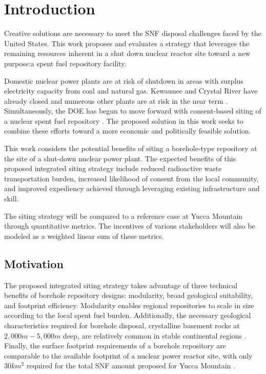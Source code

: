
\section{Introduction}
Creative solutions are necessary to meet the \gls{SNF} disposal challenges 
faced by the United States.
This work proposes and evaluates a strategy that leverages the 
remaining resources inherent in a shut down nuclear reactor site toward a new 
purpose:a spent fuel repository facility.

Domestic nuclear power plants are at risk of shutdown in areas with surplus 
electricity capacity from coal and natural gas. Kewaunee and Crystal River 
have already closed  and numerous other plants are at risk in the near term 
\cite{nei_nuclear_2016}.  Simultaneously, the \gls{DOE} 
has begun to move forward with consent-based siting of a nuclear 
spent fuel repository \cite{doe_designing_2016}. The proposed solution in this 
work seeks to combine these efforts toward a more economic and politically 
feasible solution. 

This work considers the potential benefits of siting a borehole-type repository 
at the site of a shut-down nuclear power plant.  The  expected benefits of this 
proposed integrated siting strategy include reduced radioactive waste 
transportation burden, increased likelihood of consent from the local 
community, and improved expediency achieved through leveraging existing 
infrastructure and skill.

The siting strategy will be compared to a reference case at 
Yucca Mountain through quantitative metrics. The incentives of various 
stakeholders will also be modeled as a weighted linear sum of these 
metrics. 

\subsection{Motivation}
The proposed integrated siting strategy takes advantage of three technical 
benefits of borehole repository designs: modularity, broad geological 
suitability, and footprint efficiency. Modularity enables regional repositories 
to scale in size according to the local spent fuel burden. 
Additionally, the necessary geological characteristics required for borehole 
disposal, crystalline basement rocks at $2,000 m - 5,000 m$ deep, are relatively 
common in stable continental regions \cite{arnold_research_2012}. Finally, the 
surface footprint requirements of a borehole repository are comparable to the 
available footprint of a nuclear power reactor site, with only $30 km^2$ 
required for the total \gls{SNF} amount proposed for Yucca Mountain 
\cite{brady_deep_2009}.

